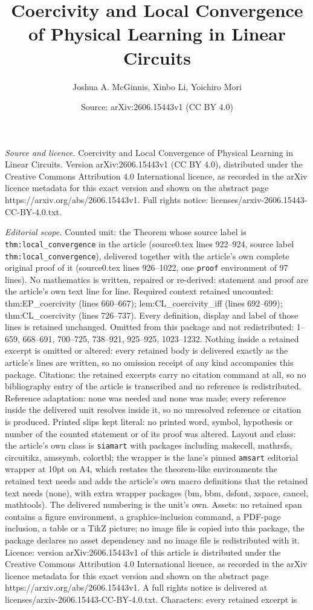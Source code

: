 \documentclass[10pt,a4paper]{amsart}
\title[Coercivity and Local Convergence of Physical Learning in Lin]{Coercivity and Local Convergence of Physical Learning in Linear Circuits}
\author{Joshua A. McGinnis, Xinbo Li, Yoichiro Mori}
\date{Source: arXiv:2606.15443v1 (CC BY 4.0)}
\begin{document}
\maketitle

\noindent\emph{Source and licence.} Coercivity and Local Convergence of Physical Learning in Linear Circuits. Version arXiv:2606.15443v1 (CC BY 4.0), distributed under the Creative Commons Attribution 4.0 International licence, as recorded in the arXiv licence metadata for this exact version and shown on the abstract page https://arxiv.org/abs/2606.15443v1. Full rights notice: licenses/arxiv-2606.15443-CC-BY-4.0.txt.\par\smallskip

\noindent\textit{Editorial scope.} Counted unit: the Theorem whose source label is \texttt{thm:local\_convergence} in the article (source0.tex lines 922--924, source label \texttt{thm:local\_convergence}), delivered together with the article's own complete original proof of it (source0.tex lines 926--1022, one \texttt{proof} environment of 97 lines). No mathematics is written, repaired or re-derived: statement and proof are the article's own text line for line. Required context retained uncounted: thm:EP\_coercivity (lines 660--667); lem:CL\_coercivity\_iff (lines 692--699); thm:CL\_coercivity (lines 726--737). Every definition, display and label of those lines is retained unchanged. Omitted from this package and not redistributed: 1--659, 668--691, 700--725, 738--921, 925--925, 1023--1232. Nothing inside a retained excerpt is omitted or altered: every retained body is delivered exactly as the article's lines are written, so no omission receipt of any kind accompanies this package. Citations: the retained excerpts carry no citation command at all, so no bibliography entry of the article is transcribed and no reference is redistributed. Reference adaptation: none was needed and none was made; every reference inside the delivered unit resolves inside it, so no unresolved reference or citation is produced. Printed slips kept literal: no printed word, symbol, hypothesis or number of the counted statement or of its proof was altered. Layout and class: the article's own class is \texttt{siamart} with packages including makecell, mathrsfs, circuitikz, amssymb, colortbl; the wrapper is the lane's pinned \texttt{amsart} editorial wrapper at 10pt on A4, which restates the theorem-like environments the retained text needs and adds the article's own macro definitions that the retained text needs (none), with extra wrapper packages (bm, bbm, dsfont, xspace, cancel, mathtools). The delivered numbering is the unit's own. Assets: no retained span contains a figure environment, a graphics-inclusion command, a PDF-page inclusion, a table or a TikZ picture; no image file is copied into this package, the package declares no asset dependency and no image file is redistributed with it. Licence: version arXiv:2606.15443v1 of this article is distributed under the Creative Commons Attribution 4.0 International licence, as recorded in the arXiv licence metadata for this exact version and shown on the abstract page https://arxiv.org/abs/2606.15443v1. A full rights notice is delivered at licenses/arxiv-2606.15443-CC-BY-4.0.txt. Characters: every retained excerpt is 
\end{document}
